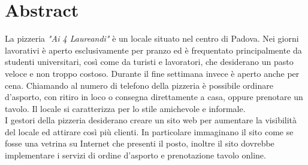 \section*{Abstract}

La pizzeria \textit{"Ai 4 Laureandi"} è un locale
situato nel centro di Padova. Nei giorni lavorativi è aperto esclusivamente
per pranzo ed è frequentato principalmente da studenti universitari, così
come da turisti e lavoratori, che desiderano un pasto veloce e non troppo costoso.
Durante il fine settimana invece è aperto anche per cena. Chiamando al numero di telefono
della pizzeria è possibile ordinare d'asporto, con ritiro in loco o consegna direttamente
a casa, oppure prenotare un tavolo. Il locale si caratterizza per lo stile
amichevole e informale.
\\
I gestori della pizzeria desiderano creare un sito web per aumentare la visibilità del locale 
ed attirare così più clienti. In particolare immaginano il sito come se fosse una vetrina 
su Internet che presenti il posto, inoltre il sito dovrebbe implementare i servizi di ordine
d'asporto e prenotazione tavolo online.